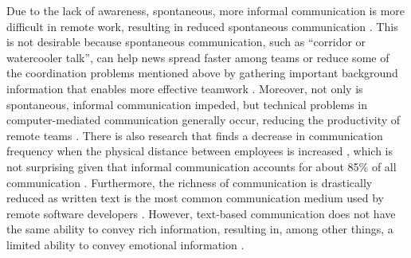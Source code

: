 Due to the lack of awareness, spontaneous, more informal communication is more difficult in remote work, resulting in reduced spontaneous communication \autocite{kraut1988patterns, sengupta2006research, herbsleb2007global, hinds2005understanding}. This is not desirable because spontaneous communication, such as \enquote{corridor or watercooler talk}, can help news spread faster among teams \autocite{herbsleb2000distance} or reduce some of the coordination problems \autocite{herbsleb1999architectures} mentioned above by gathering important background information that enables more effective teamwork \autocite{lanubile2007collaboration, herbsleb2001global}. Moreover, not only is spontaneous, informal communication impeded, but technical problems in computer-mediated communication generally occur, reducing the productivity of remote teams \autocite{sengupta2006research}. There is also research that finds a decrease in communication frequency when the physical distance between employees is increased \autocite{herbsleb2003empirical}, which is not surprising given that informal communication accounts for about 85\% of all communication \autocite{kraut1990informal}. Furthermore, the richness of communication is drastically reduced as written text is the most common communication medium used by remote software developers \autocite{gutwin2004group}. However, text-based communication does not have the same ability to convey rich information, resulting in, among other things, a limited ability to convey emotional information \autocite{hook2008interactional}.

